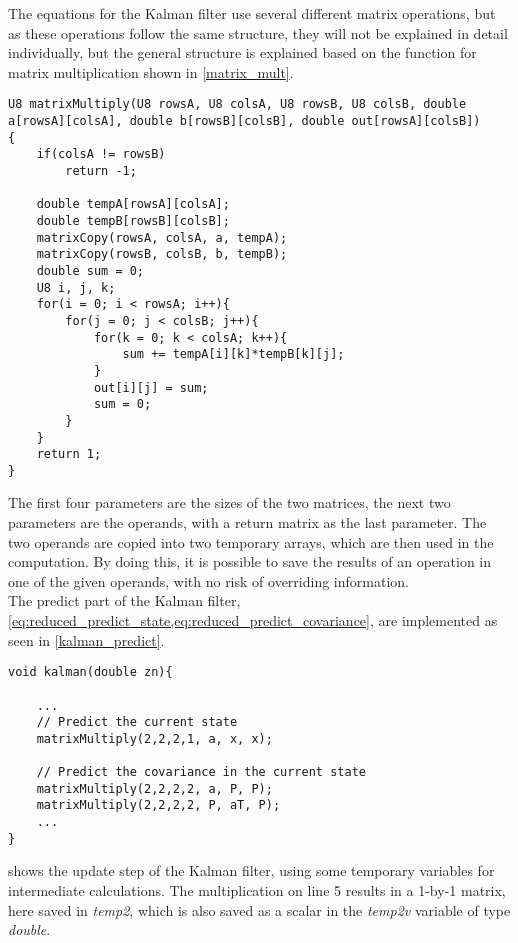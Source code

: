 The equations for the Kalman filter use several different matrix operations, but as these operations follow the same structure, they will not be explained in detail individually, but the general structure is explained based on the function for matrix multiplication shown in \cref{matrix_mult}.

\begin{lstlisting}[style=customc, label={matrix_mult}, caption={The matrix multiplication function}]
U8 matrixMultiply(U8 rowsA, U8 colsA, U8 rowsB, U8 colsB, double a[rowsA][colsA], double b[rowsB][colsB], double out[rowsA][colsB])
{
	if(colsA != rowsB)
		return -1;

	double tempA[rowsA][colsA];
	double tempB[rowsB][colsB];
	matrixCopy(rowsA, colsA, a, tempA);
	matrixCopy(rowsB, colsB, b, tempB);
	double sum = 0;
	U8 i, j, k;
	for(i = 0; i < rowsA; i++){
		for(j = 0; j < colsB; j++){
			for(k = 0; k < colsA; k++){
				sum += tempA[i][k]*tempB[k][j];
			}
			out[i][j] = sum;
			sum = 0;
		}
	}
	return 1;
}
\end{lstlisting}

The first four parameters are the sizes of the two matrices, the next two parameters are the operands, with a return matrix as the last parameter. The two operands are copied into two temporary arrays, which are then used in the computation. By doing this, it is possible to save the results of an operation in one of the given operands, with no risk of overriding information. \\

The predict part of the Kalman filter, \cref{eq:reduced_predict_state,eq:reduced_predict_covariance}, are implemented as seen in \cref{kalman_predict}.

\begin{lstlisting}[style=customc ,label={kalman_predict}, caption={The predict step of the kalman filter}]
void kalman(double zn){

    ...
    // Predict the current state
	matrixMultiply(2,2,2,1, a, x, x);
	
	// Predict the covariance in the current state
	matrixMultiply(2,2,2,2, a, P, P);
	matrixMultiply(2,2,2,2, P, aT, P);
    ...
}
\end{lstlisting}

 shows the update step of the Kalman filter, using some temporary variables for intermediate calculations. The multiplication on line 5 results in a 1-by-1 matrix, here saved in \emph{temp2}, which is also saved as a scalar in the \emph{temp2v} variable of type \emph{double}. 

